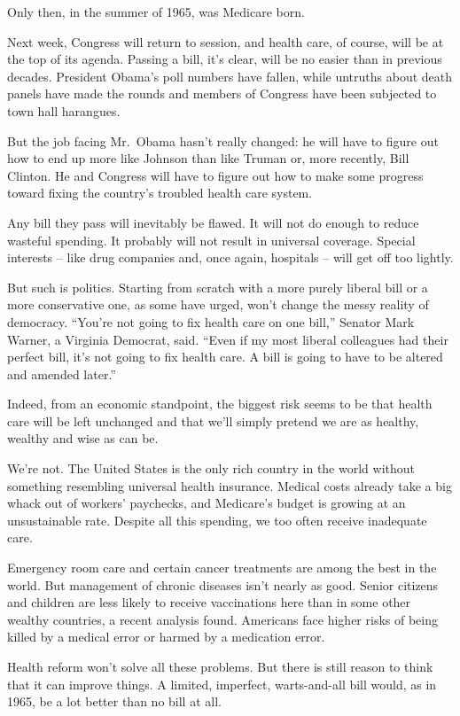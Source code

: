 ﻿\documentclass[12pt]{article}
\begin{document}
Only then, in the summer of 1965, was Medicare born.

Next week, Congress will return to session, and health care, of course, will be at the top of its
agenda. Passing a bill, it's clear, will be no easier than in previous decades. President Obama's
poll numbers have fallen, while untruths about death panels have made the rounds and members of
Congress have been subjected to town hall harangues\cite{harangue}.

But the job facing Mr.~Obama hasn't really changed: he will have to figure out how to end up more
like Johnson than like Truman or, more recently, Bill Clinton. He and Congress will have to figure
out how to make some progress toward fixing the country's troubled health care system.

Any bill they pass will inevitably be flawed. It will not do enough to reduce wasteful spending. It
probably will not result in universal coverage. Special interests -- like drug companies and, once
again, hospitals -- will get off too lightly.

But such is politics. Starting from scratch with a more purely liberal bill or a more conservative
one, as some have urged, won't change the messy reality of democracy. ``You're not going to fix
health care on one bill,'' Senator Mark Warner, a Virginia Democrat, said. ``Even if my most liberal
colleagues had their perfect bill, it's not going to fix health care. A bill is going to have to be
altered and amended later.''

Indeed, from an economic standpoint, the biggest risk seems to be that health care will be left
unchanged and that we'll simply pretend we are as healthy, wealthy and wise as can be.

We're not. The United States is the only rich country in the world without something resembling
universal health insurance. Medical costs already take a big whack out of workers' paychecks, and
Medicare's budget is growing at an unsustainable rate. Despite all this spending, we too often
receive inadequate care.

Emergency room care and certain cancer treatments are among the best in the world. But management of
chronic diseases isn't nearly as good. Senior citizens and children are less likely to receive
vaccinations here than in some other wealthy countries, a recent analysis found. Americans face
higher risks of being killed by a medical error or harmed by a medication error.

Health reform won't solve all these problems. But there is still reason to think that it can improve
things. A limited, imperfect, warts-and-all bill would, as in 1965, be a lot better than no bill at
all.
\end{document}
